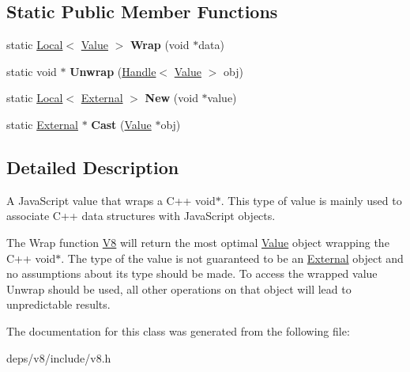 \subsection*{Static Public Member Functions}
\begin{DoxyCompactItemize}
\item 
\hypertarget{classv8_1_1_external_a37e84dd3b25e19c3b39f1e1118fcdca9}{}static \hyperlink{classv8_1_1_local}{Local}$<$ \hyperlink{classv8_1_1_value}{Value} $>$ {\bfseries Wrap} (void $\ast$data)\label{classv8_1_1_external_a37e84dd3b25e19c3b39f1e1118fcdca9}

\item 
\hypertarget{classv8_1_1_external_a8a3d966cf493d986adb7a53a17651a8b}{}static void $\ast$ {\bfseries Unwrap} (\hyperlink{classv8_1_1_handle}{Handle}$<$ \hyperlink{classv8_1_1_value}{Value} $>$ obj)\label{classv8_1_1_external_a8a3d966cf493d986adb7a53a17651a8b}

\item 
\hypertarget{classv8_1_1_external_ac870380e98927cd1e90551d7e47b8713}{}static \hyperlink{classv8_1_1_local}{Local}$<$ \hyperlink{classv8_1_1_external}{External} $>$ {\bfseries New} (void $\ast$value)\label{classv8_1_1_external_ac870380e98927cd1e90551d7e47b8713}

\item 
\hypertarget{classv8_1_1_external_a4711aba26710c5dd72f11cb81808f9c2}{}static \hyperlink{classv8_1_1_external}{External} $\ast$ {\bfseries Cast} (\hyperlink{classv8_1_1_value}{Value} $\ast$obj)\label{classv8_1_1_external_a4711aba26710c5dd72f11cb81808f9c2}

\end{DoxyCompactItemize}


\subsection{Detailed Description}
A Java\+Script value that wraps a C++ void$\ast$. This type of value is mainly used to associate C++ data structures with Java\+Script objects.

The Wrap function \hyperlink{classv8_1_1_v8}{V8} will return the most optimal \hyperlink{classv8_1_1_value}{Value} object wrapping the C++ void$\ast$. The type of the value is not guaranteed to be an \hyperlink{classv8_1_1_external}{External} object and no assumptions about its type should be made. To access the wrapped value Unwrap should be used, all other operations on that object will lead to unpredictable results. 

The documentation for this class was generated from the following file\+:\begin{DoxyCompactItemize}
\item 
deps/v8/include/v8.\+h\end{DoxyCompactItemize}
